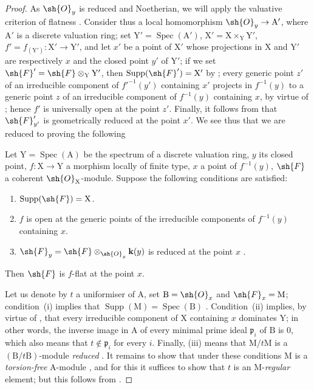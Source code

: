 \begin{proof}
\label{IV.15.2.2-proof}
As $\sh{O}_y$ is reduced and Noetherian, we will apply the valuative criterion of flatness .
Consider thus a local homomorphism $\sh{O}_y\to\mathrm{A}'$, where $\mathrm{A}'$ is a discrete valuation ring; set $\mathrm{Y}'=\operatorname{Spec}(\mathrm{A}')$, $\mathrm{X}'=\mathrm{X}\times_\mathrm{Y}\mathrm{Y}'$, $f'=f_{(\mathrm{Y}')}:\mathrm{X}'\to\mathrm{Y}'$, and let $x'$ be a point of $\mathrm{X}'$ whose projections in $\mathrm{X}$ and $\mathrm{Y}'$ are respectively $x$ and the closed point $y'$ of $\mathrm{Y}'$; if we set $\sh{F}'=\sh{F}\otimes_\mathrm{Y}\mathrm{Y}'$, then $\operatorname{Supp}(\sh{F}')=\mathrm{X}'$ by ; every generic point $z'$ of an irreducible component of $f'^{-1}(y')$ containing $x'$ projects in $f^{-1}(y)$ to a generic point $z$ of an irreducible component of $f^{-1}(y)$ containing $x$, by virtue of ; hence $f'$ is universally open at the point $z'$.
Finally, it follows from  that $\sh{F}_{y'}'$ is geometrically reduced at the point $x'$.
We see thus that we are reduced to proving the following

\begin{lemma}[15.2.2.1]
\label{IV.15.2.2.1}
Let $\mathrm{Y}=\operatorname{Spec}(\mathrm{A})$ be the spectrum of a discrete valuation ring, $y$ its closed point, $f:\mathrm{X}\to\mathrm{Y}$ a morphism locally of finite type, $x$ a point of $f^{-1}(y)$, $\sh{F}$ a coherent $\sh{O}_\mathrm{X}$-module.
Suppose the following conditions are satisfied:
\begin{enumerate}[label=(\roman*)]
  \item $\operatorname{Supp}(\sh{F})=\mathrm{X}$.
  \item $f$ is open at the generic points of the irreducible components of $f^{-1}(y)$ containing $x$.
  \item $\sh{F}_y=\sh{F}\otimes_{\sh{O}_y}\mathbf{k}(y)$ is reduced at the point $x$ .
\end{enumerate}
Then $\sh{F}$ is $f$-flat at the point $x$.
\end{lemma}

Let us denote by $t$ a uniformiser of $\mathrm{A}$, set $\mathrm{B}=\sh{O}_x$ and $\sh{F}_x=\mathrm{M}$; condition~(i) implies that $\operatorname{Supp}(\mathrm{M})=\operatorname{Spec}(\mathrm{B})$ .
Condition~(ii) implies, by virtue of , that every irreducible component of $\mathrm{X}$ containing $x$ dominates $\mathrm{Y}$; in other words, the inverse image in $\mathrm{A}$ of every minimal prime ideal $\mathfrak{p}_i$ of $\mathrm{B}$ is $0$, which also means that $t\notin\mathfrak{p}_i$ for every $i$. Finally, (iii) means that $\mathrm{M}/t\mathrm{M}$ is a $(\mathrm{B}/t\mathrm{B})$-module \emph{reduced} .
It remains to show that under these conditions $\mathrm{M}$ is a \emph{torsion-free} $\mathrm{A}$-module , and for this it suffices to show that $t$ is an $\mathrm{M}$-\emph{regular} element; but this follows from .
\end{proof}


